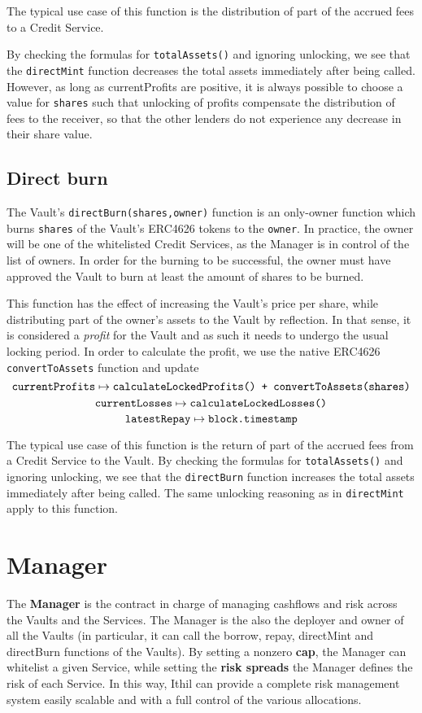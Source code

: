 \documentclass[a4paper,10 pt]{article}
\theoremstyle{definition}
\begin{document}
The typical use case of this function is the distribution of part of the accrued fees to a Credit Service.

By checking the formulas for \verb|totalAssets()| and ignoring unlocking, we see that the \verb|directMint| function decreases the total assets immediately after being called. However, as long as currentProfits are positive, it is always possible to choose a value for \verb|shares| such that unlocking of profits compensate the distribution of fees to the receiver, so that the other lenders do not experience any decrease in their share value.

\subsection{Direct burn}\label{directBurn}
The Vault's \verb|directBurn(shares,owner)|  function is an only-owner function which burns \verb|shares| of the Vault's ERC4626 tokens to the \verb|owner|. In practice, the owner will be one of the whitelisted Credit Services, as the Manager is in control of the list of owners. In order for the burning to be successful, the owner must have approved the Vault to burn at least the amount of shares to be burned.

This function has the effect of increasing the Vault's price per share, while distributing part of the owner's assets to the Vault by reflection. In that sense, it is considered a {\it profit} for the Vault and as such it needs to undergo the usual locking period. In order to calculate the profit, we use the native ERC4626 \verb|convertToAssets| function and update 
$$\verb|currentProfits| \mapsto \verb|calculateLockedProfits() + convertToAssets(shares)|$$ 
$$\verb|currentLosses| \mapsto \verb|calculateLockedLosses()|$$ 
$$\verb|latestRepay| \mapsto \verb|block.timestamp|$$

The typical use case of this function is the return of part of the accrued fees from a Credit Service to the Vault.
By checking the formulas for \verb|totalAssets()| and ignoring unlocking, we see that the \verb|directBurn| function increases the total assets immediately after being called. The same unlocking reasoning as in \verb|directMint| apply to this function.

\section{Manager}\label{managerSec}
The {\bf Manager} is the contract in charge of managing cashflows and risk across the Vaults and the Services. The Manager is the also the deployer and owner of all the Vaults (in particular, it can call the borrow, repay, directMint and directBurn functions of the Vaults). By setting a nonzero {\bf cap}, the Manager can whitelist a given Service, while setting the {\bf risk spreads} the Manager defines the risk of each Service. In this way, Ithil can provide a complete risk management system easily scalable and with a full control of the various allocations.
\end{document}
